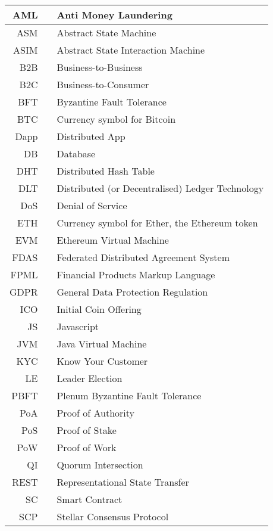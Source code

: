 \begin{table}
\begin{centering}
{\begin{tabular}{| r | c | l |}
\hline
AML		&& Anti Money Laundering\\
\hline
ASM		&& Abstract State Machine \\
\hline
ASIM	&& Abstract State Interaction Machine \\
\hline
B2B		&& Business-to-Business\\
\hline
B2C		&& Business-to-Consumer\\
\hline
BFT		&& Byzantine Fault Tolerance\\
\hline
BTC		&& Currency symbol for Bitcoin\\
\hline
Dapp	&& Distributed App\\
\hline
DB		&& Database\\
\hline
DHT		&& Distributed Hash Table\\
\hline
DLT		&& Distributed (or Decentralised) Ledger Technology\\
\hline
DoS		&& Denial of Service\\
\hline
ETH		&& Currency symbol for Ether, the Ethereum token\\
\hline
EVM		&& Ethereum Virtual Machine\\
\hline
FDAS	&& Federated Distributed Agreement System\\
\hline
FPML	&& Financial Products Markup Language\\
\hline
GDPR	&& General Data Protection Regulation\\
\hline
ICO		&& Initial Coin Offering\\
\hline
JS		&& Javascript\\
\hline
JVM		&& Java Virtual Machine\\
\hline
KYC		&& Know Your Customer\\
\hline
LE		&& Leader Election\\
\hline
PBFT	&& Plenum Byzantine Fault Tolerance\\
\hline
PoA		&& Proof of Authority\\
\hline
PoS		&& Proof of Stake \\
\hline
PoW		&& Proof of Work\\
\hline
QI		&& Quorum Intersection\\
\hline
REST 	&& Representational State Transfer\\
\hline
SC		&& Smart Contract\\
\hline
SCP		&& Stellar Consensus Protocol\\

\end{tabular}}
\end{centering}
\end{table}
